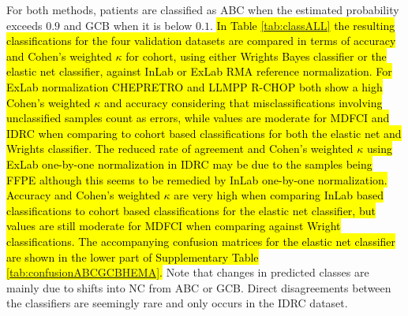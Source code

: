 \documentclass{article}
\begin{document}
For both methods, patients are classified as ABC when the estimated probability exceeds $0.9$ and GCB when it is below $0.1$.
\hl{In Table \mbox{\ref{tab:classALL}} the resulting classifications for the four validation datasets are compared in terms of accuracy and Cohen's weighted $\kappa$ for cohort, using either Wrights Bayes classifier or the elastic net classifier, against InLab or ExLab RMA reference normalization.
For ExLab normalization CHEPRETRO and LLMPP R-CHOP both show a high Cohen's weighted $\kappa$ and accuracy considering that misclassifications involving unclassified samples count as errors, while values are moderate for MDFCI and IDRC when comparing to cohort based classifications for both the elastic net and Wrights classifier. 
The reduced rate of agreement and Cohen's weighted $\kappa$ using ExLab one-by-one normalization in IDRC may be due to the samples being FFPE although this seems to be remedied by InLab one-by-one normalization. Accuracy and Cohen's weighted $\kappa$ are very high when comparing InLab based classifications to cohort based classifications for the elastic net classifier, but values are still moderate for MDFCI when comparing against Wright classifications.
The accompanying confusion matrices for the elastic net classifier are shown in the lower part of Supplementary Table \mbox{\ref{tab:confusionABCGCBHEMA}}.}
Note that changes in predicted classes are mainly due to shifts into NC from ABC or GCB.
Direct disagreements between the classifiers are seemingly rare and only occurs in the IDRC dataset.


\end{document}
